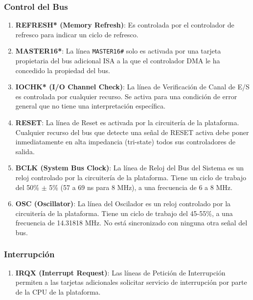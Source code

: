 \documentclass[12pt]{article}
\begin{document}
	\subsubsection*{Control del Bus}
	\begin{enumerate}
		\item \textbf{REFRESH* (Memory Refresh)}: Es controlada por el controlador de refresco para indicar un ciclo de refresco.
		
		\item \textbf{MASTER16*}: La línea \texttt{MASTER16\#} solo es activada por una tarjeta propietaria del bus adicional ISA a la que el controlador DMA le ha concedido la propiedad del bus.
		
		\item \textbf{IOCHK* (I/O Channel Check)}: La línea de Verificación de Canal de E/S es controlada por cualquier recurso. Se activa para una condición de error general que no tiene una interpretación específica.
		
		\item \textbf{RESET}: La línea de Reset es activada por la circuitería de la plataforma. Cualquier recurso del bus que detecte una señal de RESET activa debe poner inmediatamente en alta impedancia (tri-state) todos sus controladores de salida.
		
		\item \textbf{BCLK (System Bus Clock)}: La línea de Reloj del Bus del Sistema es un reloj controlado por la circuitería de la plataforma. Tiene un ciclo de trabajo del 50\% $\pm$ 5\% (57 a 69 ns para 8 MHz), a una frecuencia de 6 a 8 MHz.
		
		\item \textbf{OSC (Oscillator)}: La línea del Oscilador es un reloj controlado por la circuitería de la plataforma. Tiene un ciclo de trabajo del 45-55\%, a una frecuencia de 14.31818 MHz. No está sincronizado con ninguna otra señal del bus.
	\end{enumerate}
	
	\subsubsection*{Interrupción}
	\begin{enumerate}
		\item \textbf{IRQX (Interrupt Request)}: Las líneas de Petición de Interrupción permiten a las tarjetas adicionales solicitar servicio de interrupción por parte de la CPU de la plataforma.
	\end{enumerate}
	
\end{document}

